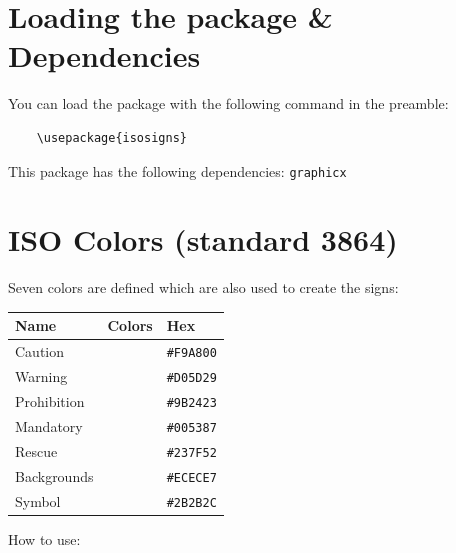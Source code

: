 \documentclass{article}
\makeatletter
\newcommand{\verbatimfontfamily}[1]{\def\verbatim@font{#1}}%
\makeatother
\begin{document}
\section{Loading the package \& Dependencies}

You can load the package with the following command in the preamble:

\vspace{5mm}
\begin{tcolorbox}[colback=gray-200]
    \vspace{3mm}
    \begin{verbatim}
    \usepackage{isosigns}
    \end{verbatim}    
\end{tcolorbox}\vspace{5mm}

\noindent This package has the following dependencies: \texttt{graphicx}

\section{ISO Colors (standard 3864)}

Seven colors are defined which are also used to create the signs: \vspace{5mm}

\renewcommand{\arraystretch}{1.2}
    \begin{tabular}{|l|l|l|}
        \hline
        \textbf{Name} & \textbf{Colors} & \textbf{Hex} \\ 
        \hline
        Caution & \cellcolor{Caution} & \texttt{\#F9A800} \\
        Warning & \cellcolor{Warning} & \texttt{\#D05D29} \\
        Prohibition & \cellcolor{Prohibition} & \texttt{\#9B2423} \\
        Mandatory & \cellcolor{Mandatory} & \texttt{\#005387} \\
        Rescue & \cellcolor{Rescue} & \texttt{\#237F52} \\
        Backgrounds & \cellcolor{Backgrounds} & \texttt{\#ECECE7} \\
        Symbol & \cellcolor{Symbol} & \texttt{\#2B2B2C} \\
        \hline
\end{tabular}\vspace{5mm}

\noindent How to use: \vspace{3mm}

\verbatimfontfamily{\ttfamily}
\end{document}

